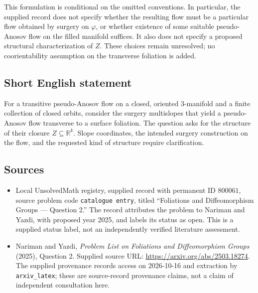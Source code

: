 \documentclass[11pt]{article}
\newcommand{\R}{\mathbb{R}}
\begin{document}
This formulation is conditional on the omitted conventions. In particular, the supplied record does not specify whether the resulting flow must be a particular flow obtained by surgery on \(\varphi\), or whether existence of some suitable pseudo-Anosov flow on the filled manifold suffices. It also does not specify a proposed structural characterization of \(Z\). These choices remain unresolved; no coorientability assumption on the transverse foliation is added.
\subsection{Short English statement}
For a transitive pseudo-Anosov flow on a closed, oriented \(3\)-manifold and a finite collection of closed orbits, consider the surgery multislopes that yield a pseudo-Anosov flow transverse to a surface foliation. The question asks for the structure of their closure \(Z\subseteq\R^k\). Slope coordinates, the intended surgery construction on the flow, and the requested kind of structure require clarification.
\subsection{Sources}
\begin{itemize}
\item Local UnsolvedMath registry, supplied record with permanent ID \(800061\), source problem code \texttt{catalogue entry}, titled ``Foliations and Diffeomorphism Groups --- Question 2.'' The record attributes the problem to Nariman and Yazdi, with proposed year 2025, and labels its status as open. This is a supplied status label, not an independently verified literature assessment.
\item Nariman and Yazdi, \emph{Problem List on Foliations and Diffeomorphism Groups} (2025), Question 2. Supplied source URL: \url{https://arxiv.org/abs/2503.18274}. The supplied provenance records access on 2026-10-16 and extraction by \texttt{arxiv\_latex}; these are source-record provenance claims, not a claim of independent consultation here.
\end{itemize}
\end{document}
